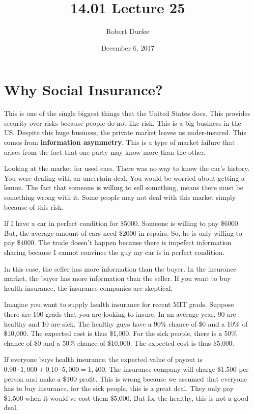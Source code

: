 \documentclass{article}
\title{ 14.01 Lecture 25 }
\author{ Robert Durfee }
\date{ December 6, 2017 }
\begin{document}
\maketitle

\section{ Why Social Insurance? }

This is one of the single biggest things that the United States does. This
provides security over risks because people do not like risk. This is a big
business in the US. Despite this huge business, the private market leaves us
under-insured. This comes from \textbf{information asymmetry}. This is a type of
market failure that arises from the fact that one party may know more than the
other. 

Looking at the market for used cars. There was no way to know the car's history.
You were dealing with an uncertain deal. You would be worried about getting a
lemon. The fact that someone is willing to sell something, means there must be
something wrong with it. Some people may not deal with this market simply
because of this risk. 

If I have a car in perfect condition for \$5000. Someone is willing to pay
\$6000. But, the average amount of cars need \$2000 in repairs. So, he is only
willing to pay \$4000. The trade doesn't happen because there is impefect
information sharing because I cannot convince the guy my car is in perfect
condition.

In this case, the seller has more information than the buyer. In the insurance
market, the buyer has more information than the seller. If you want to buy
health insurance, the insurance companies are skeptical.

Imagine you want to supply health insurance for recent MIT grads. Suppose there
are 100 grads that you are looking to insure. In an average year, 90 are healthy
and 10 are sick. The healthy guys have a 90\% chance of \$0 and a 10\% of
\$10,000. The expected cost is thus \$1,000. For the sick people, there is a
50\% chance of \$0 and a 50\% chance of \$10,000. The expected cost is thus
\$5,000. 

If everyone buys health insurance, the expected value of payout is $ 0.90 \cdot
1,000 + 0.10 \cdot 5,000 = 1,400$. The insurance company will charge \$1,500 per
person and make a \$100 profit. This is wrong because we assumed that everyone
has to buy insurance. for the sick people, this is a great deal. They only pay
\$1,500 when it would've cost them \$5,000. But for the healthy, this is not a
good deal.
\end{document}
